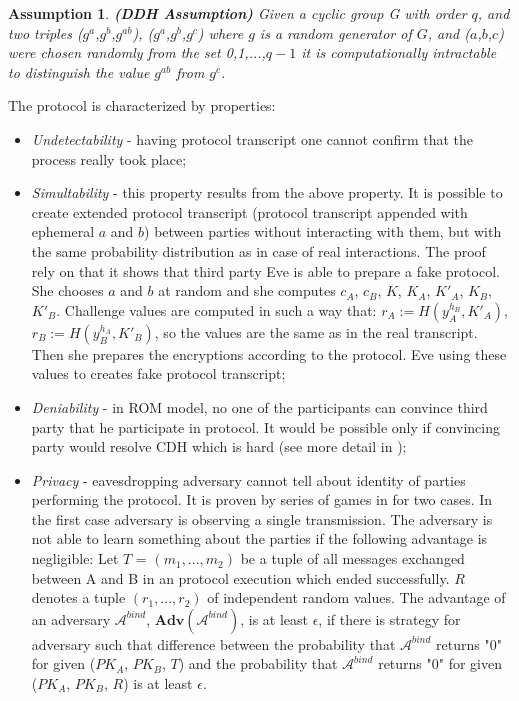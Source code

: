 \documentclass[11pt,titlepage]{article}
\theoremstyle{plain}
\newtheorem{assumption}{Assumption}
\begin{document}
\begin{assumption}
	\textbf{(DDH Assumption)} 
	Given a cyclic group G with order $q$, and two triples ($g^a$,$g^b$,$g^{ab}$), ($g^a$,$g^b$,$g^{c}$)  where $g$ 
	is a random generator of $G$, and ($a$,$b$,$c$) were chosen randomly from the set {0,1,...,$q-1$} it is computationally intractable to distinguish the value $g^{ab}$ from $g^{c}$.
\end{assumption}


The protocol is characterized by properties:
 \begin{itemize}
 	
 	\item \textit{Undetectability} - having protocol transcript one cannot confirm that the process really took place;
 	\item \textit{Simultability} - this property results from the above property. It is possible to create extended protocol transcript (protocol transcript appended with ephemeral $a$ and $b$) between parties without interacting with them, but with the same probability distribution as in case of real interactions. The proof rely on that it shows that third party Eve is able to prepare a fake protocol. She chooses $a$ and $b$ at random and she computes $c_A$, $c_B$, $K$, $K_A$, $K'_A$, $K_B$, $K'_B$. Challenge values are computed in such a way that: $r_A := H(y_A^{h_B},K'_A)$, $r_B := H(y_B^{h_A},K'_B)$, so the values are the same as in the real transcript. Then she prepares the encryptions according to the protocol. Eve using these values to creates fake protocol transcript;
 	\item \textit{Deniability} - in ROM model, no one of the participants can convince third party that he participate in protocol. It would be possible only if convincing party would resolve CDH which is hard (see more detail in \cite{AMA});
 	\item \textit{Privacy} - eavesdropping adversary cannot tell about identity of parties performing the protocol. It is proven by series of games in \cite{AMA} for two cases. In the first case adversary is observing a single transmission. The adversary is not able to learn something about the parties if the following advantage is negligible: Let $T$ = $(m_1,...,m_2)$ be a tuple of all messages exchanged between A and B in an protocol execution which ended successfully. $R$ denotes a tuple $(r_1,...,r_2)$ of independent random values. The advantage of an adversary $\mathcal{A}^{bind}$, $\textbf{Adv}(\mathcal{A}^{bind})$, is at least $\epsilon$, if there is strategy for adversary such that difference between the probability that $\mathcal{A}^{bind}$ returns "0" for given ($PK_A$, $PK_B$, $T$) and  the probability that $\mathcal{A}^{bind}$ returns "0" for given ($PK_A$, $PK_B$, $R$) is at least $\epsilon$.
 	

\end{itemize}
\end{document}
